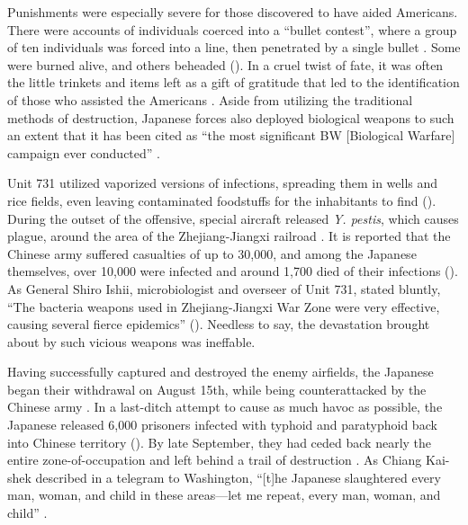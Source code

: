 Punishments were especially severe for those discovered to have aided Americans. There were accounts of individuals coerced into a “bullet contest”, where a group of ten individuals was forced into a line, then penetrated by a single bullet \autocite[p.\ 384]{Scott2015TargetTokyo}. Some were burned alive, and others beheaded (\cites[p.\ 384]{Scott2015TargetTokyo}{ChinaDaily2015VillagersHelpedSavePilots}). In a cruel twist of fate, it was often the little trinkets and items left as a gift of gratitude that led to the identification of those who assisted the Americans \autocite{ChinaDaily2015VillagersHelpedSavePilots}. Aside from utilizing the traditional methods of destruction, Japanese forces also deployed biological weapons to such an extent that it has been cited as “the most significant BW [Biological Warfare] campaign ever conducted” \autocite[p.\ 19]{Carus2017ShortHistoryBioWarfare}.

Unit 731 utilized vaporized versions of infections, spreading them in wells and rice fields, even leaving contaminated foodstuffs for the inhabitants to find (\cites[p.\ 138]{Tanaka1996HiddenHorrors}[p.\ 19]{ChevrierEtAl2006BTWCProceedings}[p.\ 18]{Carus2017ShortHistoryBioWarfare}). During the outset of the offensive, special aircraft released \emph{Y. pestis}, which causes plague, around the area of the Zhejiang-Jiangxi railroad \autocite[p.\ 18]{Carus2017ShortHistoryBioWarfare}. It is reported that the Chinese army suffered casualties of up to 30,000, and among the Japanese themselves, over 10,000 were infected and around 1,700 died of their infections (\cites[p.\ 427]{Tohmatsu2010StrategicCorrelation}). As General Shiro Ishii, microbiologist and overseer of Unit 731, stated bluntly, “The bacteria weapons used in Zhejiang-Jiangxi War Zone were very effective, causing several fierce epidemics” (\cites{PacificAtrocities2024BacteriologicalWarfareChina}{PBS2024ShiroIshii}). Needless to say, the devastation brought about by such vicious weapons was ineffable.

Having successfully captured and destroyed the enemy airfields, the Japanese began their withdrawal on August 15th, while being counterattacked by the Chinese army \autocite[p.\ 12]{Sherry1996ChinaDefensive}. In a last-ditch attempt to cause as much havoc as possible, the Japanese released 6,000 prisoners infected with typhoid and paratyphoid back into Chinese territory (\cites[p.\ 18]{Carus2017ShortHistoryBioWarfare}[pp.\ 160, 169]{Yin2002RapeOfBiologicalWarfare}). By late September, they had ceded back nearly the entire zone-of-occupation and left behind a trail of destruction \autocite[p.\ 2250]{XiongZhou2000GreatDictionaryMilitary}. As Chiang Kai-shek described in a telegram to Washington, “[t]he Japanese slaughtered every man, woman, and child in these areas—let me repeat, every man, woman, and child” \autocite{Scott2015SmithsonianUntoldStory}.

